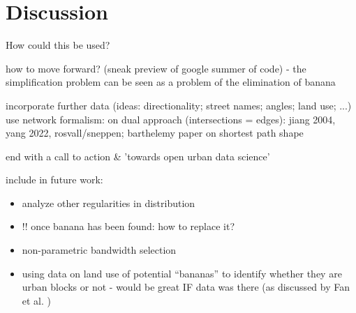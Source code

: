 \section{Discussion}
\label{sec:discussion}

How could this be used?

how to move forward? (sneak preview of google summer of code) - the simplification problem can be seen as a problem of the elimination of banana

incorporate further data (ideas: directionality; street names; angles; land use; ...)
use network formalism: on dual approach (intersections = edges): jiang 2004, yang 2022,
rosvall/sneppen; barthelemy paper on shortest path shape

end with a call to action \& 'towards open urban data science'

\bigskip

include in future work:
\begin{itemize}
    \item analyze other regularities in distribution
    \item !! once banana has been found: how to replace it?
    \item non-parametric bandwidth selection
    \item using data on land use of potential ``bananas'' to identify whether they are urban blocks or not - would be great IF data was there (as discussed by Fan et al.  \cite{fan_polygon-based_2016})
\end{itemize}